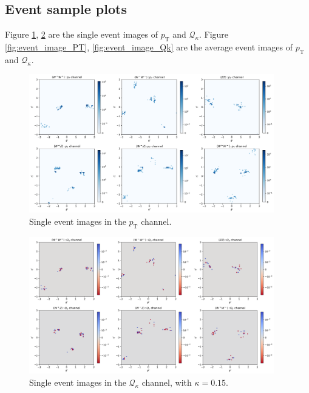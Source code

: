 \documentclass[12pt]{article}
\begin{document}
	\subsection{Event sample plots}%
	\label{sub:event_sample_plots}
		Figure \ref{fig:single_event_image_PT}, \ref{fig:single_event_image_Qk} are the single event images of $p_\text{T}$ and $\mathcal{Q}_\kappa$. Figure \ref{fig:event_image_PT}, \ref{fig:event_image_Qk} are the average event images of $p_\text{T}$ and $\mathcal{Q}_\kappa$.
		\begin{figure}[htpb]
			\centering
			\includegraphics[width=0.95\textwidth]{single_event_image_PT.png}
			\caption{Single event images in the $p_\text{T}$ channel.}
			\label{fig:single_event_image_PT}
		\end{figure}
		\begin{figure}[htpb]
			\centering
			\includegraphics[width=0.95\textwidth]{single_event_image_Qk.png}
			\caption{Single event images in the $\mathcal{Q}_\kappa$ channel, with $\kappa = 0.15$.}
			\label{fig:single_event_image_Qk}
		\end{figure}
\end{document}
